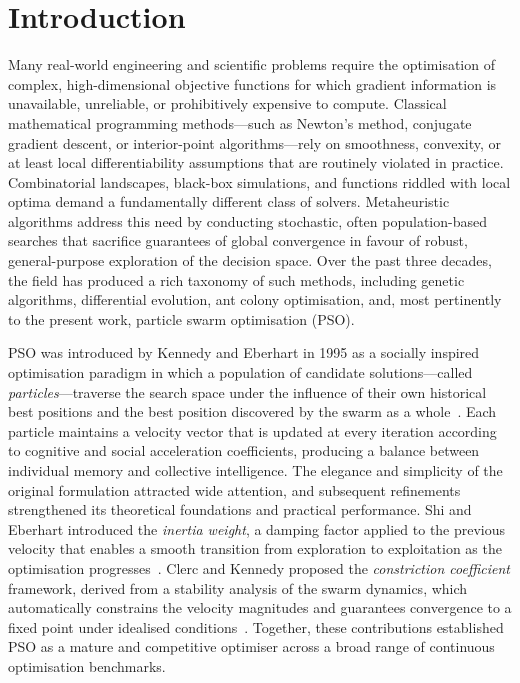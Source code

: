 \section{Introduction}
\label{sec:introduction}

Many real-world engineering and scientific problems require the optimisation of
complex, high-dimensional objective functions for which gradient information is
unavailable, unreliable, or prohibitively expensive to compute.  Classical
mathematical programming methods---such as Newton's method, conjugate gradient
descent, or interior-point algorithms---rely on smoothness, convexity, or at
least local differentiability assumptions that are routinely violated in
practice.  Combinatorial landscapes, black-box simulations, and functions
riddled with local optima demand a fundamentally different class of solvers.
Metaheuristic algorithms address this need by conducting stochastic, often
population-based searches that sacrifice guarantees of global convergence in
favour of robust, general-purpose exploration of the decision space.  Over the
past three decades, the field has produced a rich taxonomy of such methods,
including genetic algorithms, differential evolution, ant colony optimisation,
and, most pertinently to the present work, particle swarm optimisation (PSO).

PSO was introduced by Kennedy and Eberhart in 1995 as a socially inspired
optimisation paradigm in which a population of candidate solutions---called
\emph{particles}---traverse the search space under the influence of their own
historical best positions and the best position discovered by the swarm as a
whole~\cite{Kennedy1995}.  Each particle maintains a velocity vector that is
updated at every iteration according to cognitive and social acceleration
coefficients, producing a balance between individual memory and collective
intelligence.  The elegance and simplicity of the original formulation
attracted wide attention, and subsequent refinements strengthened its
theoretical foundations and practical performance.  Shi and Eberhart introduced
the \emph{inertia weight}, a damping factor applied to the previous velocity
that enables a smooth transition from exploration to exploitation as the
optimisation progresses~\cite{Shi1998}.  Clerc and Kennedy proposed the
\emph{constriction coefficient} framework, derived from a stability analysis of
the swarm dynamics, which automatically constrains the velocity magnitudes and
guarantees convergence to a fixed point under idealised
conditions~\cite{Clerc2002}.  Together, these contributions established PSO as
a mature and competitive optimiser across a broad range of continuous
optimisation benchmarks.

